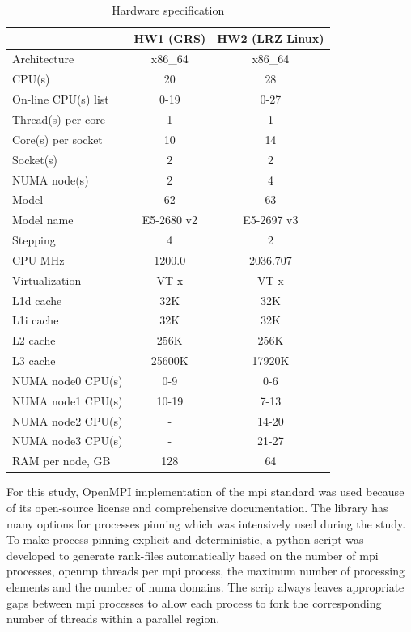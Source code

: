 \begin{table}
\centering
\small
\begin{tabular}{|l|c|c|}
\hline
                    & HW1 (GRS) & HW2 (LRZ Linux) \\ \hline
Architecture        & x86\_64 & x86\_64 \\ \hline
CPU(s)              & 20 &  28 \\ \hline
On-line CPU(s) list & 0-19 &  0-27 \\ \hline
Thread(s) per core  & 1 &  1 \\  \hline
Core(s) per socket  & 10 & 14 \\ \hline
Socket(s)           & 2 &  2 \\ \hline
NUMA node(s)        & 2 &  4 \\ \hline
Model               & 62 &  63 \\ \hline
Model name          & E5-2680 v2 & 
E5-2697 v3 \\ \hline
Stepping            & 4 &  2 \\ \hline
CPU MHz             & 1200.0 &  2036.707 \\ \hline
Virtualization      & VT-x &  VT-x \\ \hline
L1d cache           & 32K &  32K \\ \hline
L1i cache           & 32K &  32K \\ \hline
L2 cache            & 256K &  256K \\ \hline
L3 cache            & 25600K &  17920K \\ \hline
NUMA node0 CPU(s)   & 0-9 &  0-6 \\ \hline
NUMA node1 CPU(s)   & 10-19 &  7-13 \\ \hline
NUMA node2 CPU(s)   & - &  14-20 \\ \hline
NUMA node3 CPU(s)   & - &  21-27 \\ \hline
RAM per node, GB   & 128 &  64 \\ \hline
\end{tabular}
\caption{Hardware specification}
\label{table:hardware-spec}
\end{table}


For this study, OpenMPI implementation of the \acrshort{mpi} standard was used because of its open-source license and comprehensive documentation. The library has many options for processes pinning which was intensively used during the study.\\


To make process pinning explicit and deterministic, a python script was developed to generate rank-files automatically based on the number of \acrshort{mpi} processes, \acrshort{openmp} threads per \acrshort{mpi} process, the maximum number of processing elements and the number of \acrshort{numa} domains. The scrip always leaves appropriate gaps between \acrshort{mpi} processes to allow each process to fork the corresponding number of threads within a parallel region.\\


